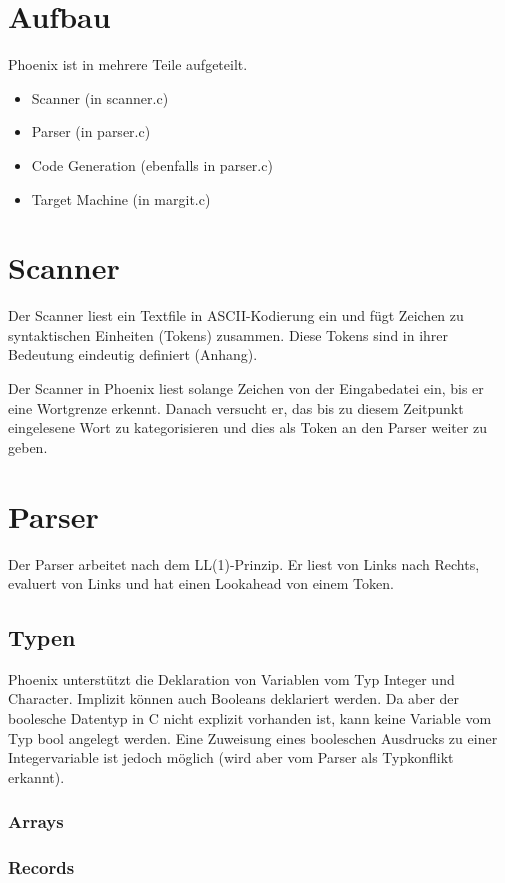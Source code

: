 \documentclass[a4paper]{article}
\begin{document}
	\section{Aufbau}
	Phoenix ist in mehrere Teile aufgeteilt.
	\begin{itemize}
		\item Scanner (in scanner.c)
		\item Parser (in parser.c)
		\item Code Generation (ebenfalls in parser.c)
		\item Target Machine (in margit.c)
	\end{itemize}


	\section{Scanner}
	Der Scanner liest ein Textfile in ASCII-Kodierung ein und fügt Zeichen zu syntaktischen Einheiten (Tokens) zusammen.
	Diese Tokens sind in ihrer Bedeutung eindeutig definiert (Anhang).

	Der Scanner in Phoenix liest solange Zeichen von der Eingabedatei ein, bis er eine Wortgrenze erkennt.
	Danach versucht er, das bis zu diesem Zeitpunkt eingelesene Wort zu kategorisieren und dies als Token an den Parser weiter zu geben.

	\section{Parser}
	Der Parser arbeitet nach dem LL(1)-Prinzip. Er liest von Links nach Rechts, evaluert von Links und hat einen Lookahead von einem Token.

	\subsection{Typen}

	Phoenix unterstützt die Deklaration von Variablen vom Typ Integer und Character.
	Implizit können auch Booleans deklariert werden.
	Da aber der boolesche Datentyp in C nicht explizit vorhanden ist, kann keine Variable vom Typ bool angelegt werden.
	Eine Zuweisung eines booleschen Ausdrucks zu einer Integervariable ist jedoch möglich (wird aber vom Parser als Typkonflikt erkannt).

	\subsubsection{Arrays}

	\subsubsection{Records}
\end{document}
